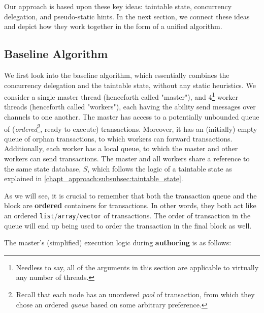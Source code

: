 Our approach is based upon these key ideas: taintable state, concurrency delegation, and pseudo-static hints. In the next section, we connect these ideas and
depict how they work together in the form of a unified algorithm.

\subsection{Baseline Algorithm} \label{subsec:baseline_alg}

We first look into the baseline algorithm, which essentially combines the concurrency delegation and
the taintable state, without any static heuristics. We consider a single master thread (henceforth
called "master"), and $4$\footnote{Needless to say, all of the arguments in this section are
applicable to virtually any number of threads.} worker threads (henceforth called "workers"),
each having the ability send messages over channels to one another. The master has access to a
potentially unbounded queue of (\textit{ordered}\footnote{Recall that each node has an unordered
\textit{pool} of transaction, from which they chose an ordered \textit{queue} based on some
arbitrary preference.}, ready to execute) transactions. Moreover, it has an (initially) empty queue
of orphan transactions, to which workers can forward transactions. Additionally, each worker has a
local queue, to which the master and other workers can send transactions. The master and all workers
share a reference to the same state database, $S$, which follows the logic of a taintable state as
explained in \ref{chapt_approach:subsubsec:taintable_state}.

\begin{remark}
	As we will see, it is crucial to remember that both the transaction queue and the block are
	\textbf{ordered} containers for transactions. In other words, they both act like an ordered
	\texttt{list}/\texttt{array}/\texttt{vector} of transactions. The order of transaction in the
	queue will end up being used to order the transaction in the final block as well.
\end{remark}

The master's (simplified) execution logic during \textbf{authoring} is as follows:

